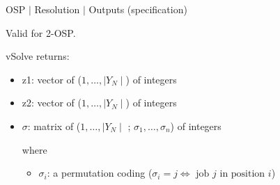 %
% 
\begin{frame}{OSP $\mid$ Resolution $\mid$ Outputs (specification)}

Valid for 2-OSP.
\bigskip

vSolve returns:
\medskip
                           \begin{itemize}
                              \item z1: vector of ($1, \dots, \mid Y_N \mid $) of integers
                              \item z2: vector of ($1,\dots, \mid Y_N \mid $) of integers
                              \item $\sigma$: matrix of ($1,\dots, \mid Y_N \mid $ ; $\sigma_1, \dots, \sigma_n$) of integers
                                                                                         
                              where
                               \begin{itemize}
                                     \item $\sigma_i$:  a permutation coding ($\sigma_i=j  \Leftrightarrow \mbox{ job } j \mbox{ in position } i$)
                                \end{itemize}
                           \end{itemize}               

\end{frame}

